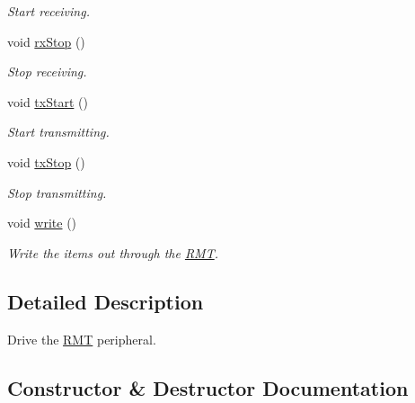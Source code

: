 \begin{DoxyCompactItemize}
\begin{DoxyCompactList}\small\item\em Start receiving. \end{DoxyCompactList}\item 
void \hyperlink{class_r_m_t_a0f3abda595084f39bc5a524b468feeab}{rx\+Stop} ()\hypertarget{class_r_m_t_a0f3abda595084f39bc5a524b468feeab}{}\label{class_r_m_t_a0f3abda595084f39bc5a524b468feeab}

\begin{DoxyCompactList}\small\item\em Stop receiving. \end{DoxyCompactList}\item 
void \hyperlink{class_r_m_t_a4dd6deb2c682661f70dd9b17519455e6}{tx\+Start} ()\hypertarget{class_r_m_t_a4dd6deb2c682661f70dd9b17519455e6}{}\label{class_r_m_t_a4dd6deb2c682661f70dd9b17519455e6}

\begin{DoxyCompactList}\small\item\em Start transmitting. \end{DoxyCompactList}\item 
void \hyperlink{class_r_m_t_a5b4184c0472608379fdd868e3aa68e15}{tx\+Stop} ()\hypertarget{class_r_m_t_a5b4184c0472608379fdd868e3aa68e15}{}\label{class_r_m_t_a5b4184c0472608379fdd868e3aa68e15}

\begin{DoxyCompactList}\small\item\em Stop transmitting. \end{DoxyCompactList}\item 
void \hyperlink{class_r_m_t_a0eef7f4df02df1f9e0f33cde2cb3ee1f}{write} ()
\begin{DoxyCompactList}\small\item\em Write the items out through the \hyperlink{class_r_m_t}{R\+MT}. \end{DoxyCompactList}\end{DoxyCompactItemize}


\subsection{Detailed Description}
Drive the \hyperlink{class_r_m_t}{R\+MT} peripheral. 

\subsection{Constructor \& Destructor Documentation}
